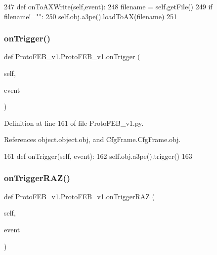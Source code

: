 \begin{DoxyCode}
247     \textcolor{keyword}{def }onToAXWrite(self,event):
248         filename = self.getFile()
249         \textcolor{keywordflow}{if} filename!=\textcolor{stringliteral}{""}:
250             self.obj.a3pe().loadToAX(filename)
251 
\end{DoxyCode}
\mbox{\label{classProtoFEB__v1_1_1ProtoFEB__v1_adf08ce25a443183367172750dac37a08}} 
\subsubsection{\texorpdfstring{on\+Trigger()}{onTrigger()}}
{\footnotesize\ttfamily def Proto\+F\+E\+B\+\_\+v1.\+Proto\+F\+E\+B\+\_\+v1.\+on\+Trigger (\begin{DoxyParamCaption}\item[{}]{self,  }\item[{}]{event }\end{DoxyParamCaption})}



Definition at line 161 of file Proto\+F\+E\+B\+\_\+v1.\+py.



References object.\+object.\+obj, and Cfg\+Frame.\+Cfg\+Frame.\+obj.


\begin{DoxyCode}
161     \textcolor{keyword}{def }onTrigger(self, event):
162         self.obj.a3pe().trigger()
163 
\end{DoxyCode}
\mbox{\label{classProtoFEB__v1_1_1ProtoFEB__v1_ab38e96accffbc2a3329955acb9a00ebb}} 
\subsubsection{\texorpdfstring{on\+Trigger\+R\+A\+Z()}{onTriggerRAZ()}}
{\footnotesize\ttfamily def Proto\+F\+E\+B\+\_\+v1.\+Proto\+F\+E\+B\+\_\+v1.\+on\+Trigger\+R\+AZ (\begin{DoxyParamCaption}\item[{}]{self,  }\item[{}]{event }\end{DoxyParamCaption})}



